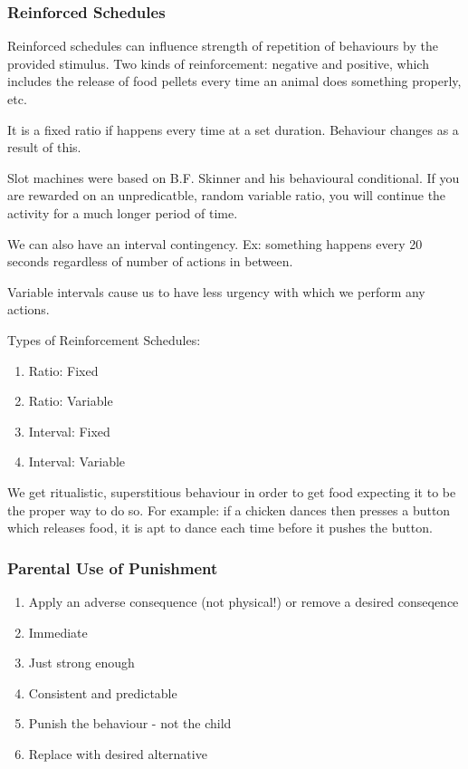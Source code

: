 \documentclass[12pt]{article}
\begin{document}
\subsubsection*{Reinforced Schedules}
Reinforced schedules can influence strength of repetition of behaviours by the provided stimulus. Two kinds of reinforcement: negative and positive, which includes the release of food pellets every time an animal does something properly, etc.

It is a fixed ratio if happens every time at a set duration. Behaviour changes as a result of this. 

Slot machines were based on B.F. Skinner and his behavioural conditional. If you are rewarded on an unpredicatble, random variable ratio, you will continue the activity for a much longer period of time.

We can also have an interval contingency. Ex: something happens every 20 seconds regardless of number of actions in between.

Variable intervals cause us to have less urgency with which we perform any actions.

Types of Reinforcement Schedules:
\begin{enumerate}
\item Ratio: Fixed
\item Ratio: Variable
\item Interval: Fixed
\item Interval: Variable
\end{enumerate}

We get ritualistic, superstitious behaviour in order to get food expecting it to be the proper way to do so. For example: if a chicken dances then presses a button which releases food, it is apt to dance each time before it pushes the button.

\subsubsection*{Parental Use of Punishment}
\begin{enumerate}
\item Apply an adverse consequence (not physical!) or remove a desired conseqence
\item Immediate
\item Just strong enough
\item Consistent and predictable
\item Punish the behaviour - not the child
\item Replace with desired alternative
\end{enumerate}
\end{document}

